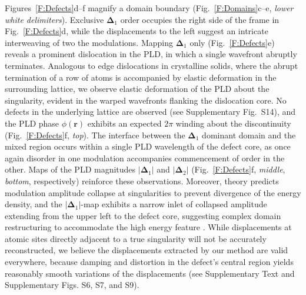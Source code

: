 \documentclass[12pt]{article}
\begin{document}
Figures~\ref{F:Defects}d--f magnify a domain boundary (Fig.~\ref{F:Domains}c--e, \textit{lower white delimiters}).
Exclusive $\mathbf{\Delta}_1$ order occupies the right side of the frame in Fig.~\ref{F:Defects}d, while the displacements to the left suggest an intricate interweaving of two the modulations.
Mapping $\mathbf{\Delta}_1$ only (Fig.~\ref{F:Defects}e) reveals a prominent dislocation in the PLD, in which a single wavefront abruptly terminates.
Analogous to edge dislocations in crystalline solids, where the abrupt termination of a row of atoms is accompanied by elastic deformation in the surrounding lattice, we observe elastic deformation of the PLD about the singularity, evident in the warped wavefronts flanking the dislocation core.
No defects in the underlying lattice are observed (see Supplementary Fig.~S14), and the PLD phase $\phi(\mathbf{r})$ exhibits an expected $2\pi$ winding about the discontinuity (Fig.~\ref{F:Defects}f, \textit{top}).
The interface between the $\mathbf{\Delta}_1$ dominant domain and the mixed region occurs within a single PLD wavelength of the defect core, as once again disorder in one modulation accompanies commencement of order in the other.
Maps of the PLD magnitudes $\lvert\mathbf{\Delta}_1\rvert$ and $\lvert\mathbf{\Delta}_2\rvert$ (Fig.~\ref{F:Defects}f, \textit{middle}, \textit{bottom}, respectively) reinforce these observations.
Moreover, theory predicts modulation amplitude collapse at singularities to prevent divergence of the energy density, and the $\lvert\mathbf{\Delta}_1\rvert$-map exhibits a narrow inlet of collapsed amplitude extending from the upper left to the defect core, suggesting complex domain restructuring to accommodate the high energy feature \cite{Feinberg1988,Brazovskii2004,Lee1979,coppersmith1991diverging}.
While displacements at atomic sites directly adjacent to a true singularity will not be accurately reconstructed, we believe the displacements extracted by our method are valid everywhere, because damping and distortion in the defect's central region yields reasonably smooth variations of the displacements (see Supplementary Text and Supplementary Figs. S6, S7, and S9).
\end{document}
